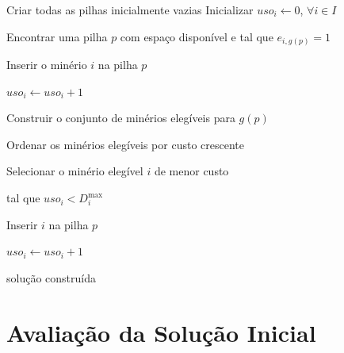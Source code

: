 \documentclass[12pt,a4paper]{article}
\begin{document}
\begin{algorithm}[H]

\caption{Heurística construtiva da solução inicial}
\label{alg:construtiva}

\begin{algorithmic}[1]

\State Criar todas as pilhas inicialmente vazias
\State Inicializar $uso_i \gets 0$, $\forall i\in I$



        \State Encontrar uma pilha $p$ com espaço disponível
        \Statex \hspace{\algorithmicindent}
        e tal que $e_{i,g(p)}=1$

        \State Inserir o minério $i$ na pilha $p$

        \State $uso_i \gets uso_i + 1$

    \EndFor

\EndFor


    \State Construir o conjunto de minérios elegíveis para $g(p)$

    \State Ordenar os minérios elegíveis por custo crescente


        \State Selecionar o minério elegível $i$ de menor custo

        \Statex \hspace{\algorithmicindent}
        tal que $uso_i < D_i^{\max}$

        \State Inserir $i$ na pilha $p$

        \State $uso_i \gets uso_i + 1$

    \EndWhile

\EndFor

\State \Return solução construída

\end{algorithmic}

\end{algorithm}



\section{Avaliação da Solução Inicial}
\end{document}
